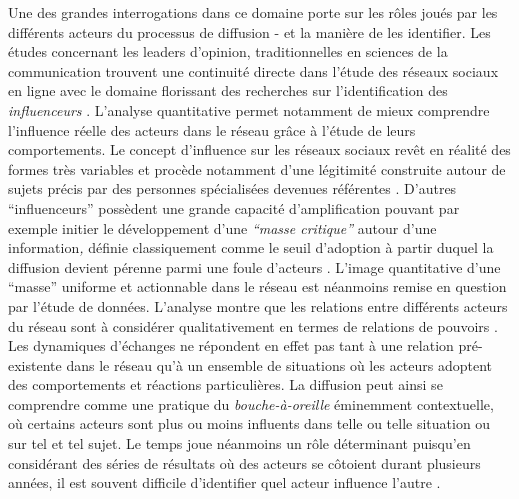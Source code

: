 Une des grandes interrogations dans ce domaine porte sur les r\^oles joués par les différents acteurs du processus de diffusion - et la manière de les identifier. Les études concernant les leaders d{\textquoteright}opinion, traditionnelles en sciences de la communication \citep{Katz1955} trouvent une continuité directe dans l{\textquoteright}étude des réseaux sociaux en ligne avec le domaine florissant des recherches sur l{\textquoteright}identification des \textit{influenceurs} \citep{Bakshy2011, Leavitt2009}. L{\textquoteright}analyse quantitative permet notamment de mieux comprendre l{\textquoteright}influence réelle des acteurs dans le réseau gr\^ace à l{\textquoteright}étude de leurs comportements. Le concept d{\textquoteright}influence sur les réseaux sociaux rev\^et en réalité des formes très variables et procède notamment d{\textquoteright}une légitimité construite autour de sujets précis par des personnes spécialisées devenues référentes \citep{Cha2010}. D{\textquoteright}autres {\textquotedblleft}influenceurs{\textquotedblright} possèdent une grande capacité d{\textquoteright}amplification pouvant par exemple initier le développement d{\textquoteright}une \textit{{\textquotedblleft}masse critique{\textquotedblright} }autour d{\textquoteright}une information\textit{, }définie classiquement comme le seuil d{\textquoteright}adoption à partir duquel la diffusion devient pérenne parmi une foule d{\textquoteright}acteurs \citep{Oliver2001}. L{\textquoteright}image quantitative d{\textquoteright}une {\textquotedblleft}masse{\textquotedblright} uniforme et actionnable dans le réseau est néanmoins remise en question par l{\textquoteright}étude de données. L{\textquoteright}analyse montre que les relations entre différents acteurs du réseau sont à considérer qualitativement en termes de relations de pouvoirs \citep{Steyer2006}. Les dynamiques d{\textquoteright}échanges ne répondent en effet pas tant à une relation pré-existente dans le réseau qu{\textquoteright}à un ensemble de situations o\`u les acteurs adoptent des comportements et réactions particulières. La diffusion peut ainsi se comprendre comme une pratique du \textit{bouche-à-oreille} éminemment contextuelle, o\`u certains acteurs sont plus ou moins influents dans telle ou telle situation ou sur tel et tel sujet. Le temps joue néanmoins un r\^ole déterminant puisqu{\textquoteright}en considérant des séries de résultats o\`u des acteurs se c\^otoient durant plusieurs années, il est souvent difficile d{\textquoteright}identifier quel acteur influence l{\textquoteright}autre \citep{Aral2009}.

